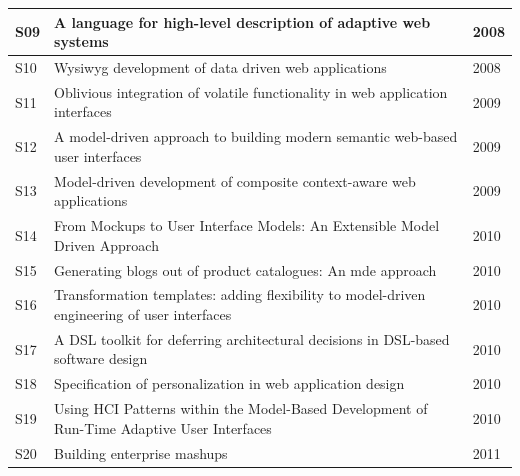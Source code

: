 \begin{table}[ht!]
\begin{tabular}{ | p{0.3cm} | p{6.2cm} | p{0.7cm}|}
S09 &  A language for high-level description of adaptive web systems~\cite{sadat2008language}  & 2008 \\ \hline

S10 &  Wysiwyg development of data driven web applications~\cite{Yang08}  & 2008 \\ \hline

S11 &  Oblivious integration of volatile functionality in web application interfaces~\cite{Ginzburg09}  & 2009\\ \hline

S12 &  A model-driven approach to building modern semantic web-based user interfaces~\cite{chavarriaga2009model}  & 2009 \\ \hline

S13 &  Model-driven development of composite context-aware web applications~\cite{KAPITSAKI20091244}  & 2009 \\ \hline		


S14 &  From Mockups to User Interface Models: An Extensible Model Driven Approach~\cite{Rivero10}  & 2010	\\ \hline 


S15 &  Generating blogs out of product catalogues: An mde approach~\cite{diaz2010generating}  &  2010 \\ \hline

S16 &  Transformation templates:  adding flexibility to model-driven engineering of user interfaces~\cite{Aquino10}  &  2010 \\ \hline

S17 &  A DSL toolkit for deferring architectural decisions in DSL-based software design~\cite{ZDUN2010733}  & 2010 \\ \hline 

S18 & Specification of personalization in web application design~\cite{GARRIGOS2010991}	 &  2010 \\ \hline	

S19 &  Using HCI Patterns within the Model-Based Development of Run-Time Adaptive User Interfaces~\cite{SEISSLER2010477}  &  2010 \\ \hline

S20 &  Building enterprise mashups~\cite{DEVRIEZE2011637}  & 2011\\ \hline



\end{tabular}
\end{table}
